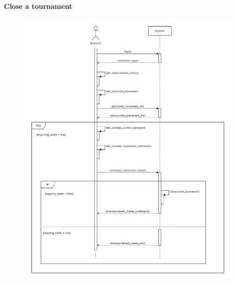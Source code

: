 \documentclass[../RASD.tex]{subfiles}
\begin{document}
    \textbf{Close a tournament}
    \begin{figure}[h!]
        \centering
        \includegraphics[width=1\textwidth]{../assets/section_3/CloseATournamentEarly.png}
    \end{figure}
    \newpage
    \restoregeometry
\end{document}
